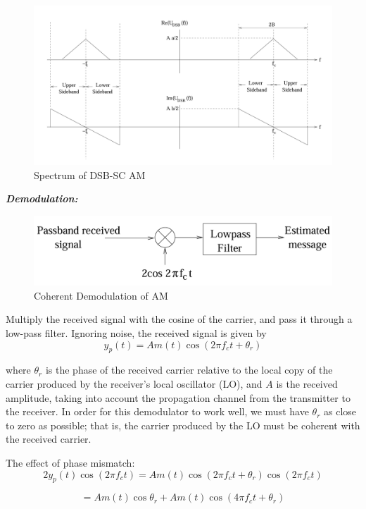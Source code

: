 \documentclass[conference]{IEEEtran}
\begin{document}
   \begin{figure}
       \centering
       \includegraphics[width=1\linewidth]{DSB_SC_Passband_Spectrum.png}
       \caption{Spectrum of DSB-SC AM}
   \end{figure}

\textbf{\textit{Demodulation: }}
\begin{figure}
    \centering
    \includegraphics[width=1\linewidth]{Coherent_demodulation_AM.png}
    \caption{Coherent Demodulation of AM}
\end{figure}

Multiply the received signal with the cosine of the carrier, and pass it through a low-pass filter. Ignoring noise, the received signal is given by
\[
    y_p(t) = A m(t) \cos(2\pi f_c t + \theta_r)
\]

where \(\theta_r\) is the phase of the received carrier relative to the local copy of the carrier produced by the receiver’s local oscillator (LO), and \(A\) is the received amplitude, taking into account the propagation channel from the transmitter to the receiver. In order for this demodulator to work well, we must have \(\theta_r\) as close to zero as possible; that is, the carrier produced by the LO must be coherent with the received carrier.

The effect of phase mismatch:
\[
    2y_p(t) \cos(2\pi f_c t) = A m(t) \cos(2\pi f_c t + \theta_r) \cos(2\pi f_c t)
\]

\[
=A m(t) \cos\theta_r + A m(t) \cos(4\pi f_c t + \theta_r)
\]
\end{document}
